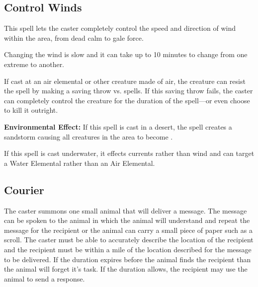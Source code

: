 \begin{multicols*}{2}
\subsection{Control Winds}\label{spell:Control Winds}

This spell lets the caster completely control the speed and direction of wind within the area, from dead calm to gale force.

Changing the wind is slow and it can take up to 10 minutes to change from one extreme to another.

If cast at an air elemental or other creature made of air, the creature can resist the spell by making a saving throw vs. spells. If this saving throw fails, the caster can completely control the creature for the duration of the spell—or even choose to kill it outright.

\textbf{Environmental Effect:} If this spell is cast in a desert, the spell creates a sandstorm causing all creatures in the area to become .

If this spell is cast underwater, it effects currents rather than wind and can target a Water Elemental rather than an Air Elemental.

\subsection{Courier}\label{spell:Courier}

The caster summons one small animal that will deliver a message. The message can be spoken to the animal in which the animal will understand and repeat the message for the recipient or the animal can carry a small piece of paper such as a scroll. The caster must be able to accurately describe the location of the recipient and the recipient must be within a mile of the location described for the message to be delivered. If the duration expires before the animal finds the recipient than the animal will forget it's task. If the duration allows, the recipient may use the animal to send a response. 


\end{multicols*}
